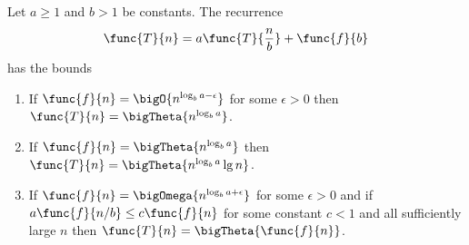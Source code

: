 \begin{theorem}
    Let \(a \geq 1\) and \(b > 1\) be constants. The recurrence
    \begin{equation*}
        \func{T}{n} = a \func{T}{\frac{n}{b}} + \func{f}{b}
    \end{equation*}
    has the bounds
    \begin{enumerate}
        \item If \(\func{f}{n} = \bigO{n^{\log_b a - \epsilon}}\) for some \(\epsilon > 0\) then \(\func{T}{n} = \bigTheta{n^{\log_b a }}\).
        \item If \(\func{f}{n} = \bigTheta{n^{\log_b a}}\) then \(\func{T}{n} = \bigTheta{n^{\log_b a } \lg n}\).
        \item If \(\func{f}{n} = \bigOmega{n^{\log_b a + \epsilon}}\) for some \(\epsilon > 0\) and if \(a\func{f}{n/b} \leq c \func{f}{n}\) for some constant \(c < 1\) and all sufficiently large \(n\) then \(\func{T}{n} = \bigTheta{\func{f}{n}}\).
    \end{enumerate}
\end{theorem}
